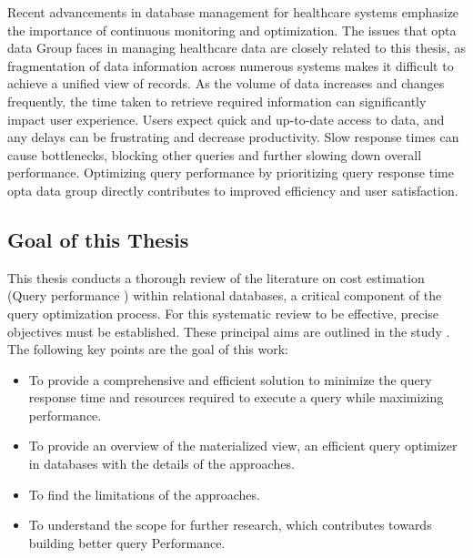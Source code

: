 
Recent advancements in database management for healthcare systems emphasize the importance of continuous monitoring and optimization. The issues that opta data Group faces in managing healthcare data are closely related to this thesis, as fragmentation of data information across numerous systems makes it difficult to achieve a unified view of records. As the volume of data increases and changes frequently, the time taken to retrieve required information can significantly impact user experience. Users expect quick and up-to-date access to data, and any delays can be frustrating and decrease productivity. Slow response times can cause bottlenecks, blocking other queries and further slowing down overall performance. Optimizing query performance by prioritizing query response time opta data group directly contributes to improved efficiency and user satisfaction.

\subsection{Goal of this Thesis}
\normalsize
This thesis conducts a thorough review of the literature on cost estimation (Query performance ) within relational databases, a critical component of the query optimization process. For this systematic review to be effective, precise objectives must be established. These principal aims are outlined in the study \cite{CostEstimation}. The following key points are the goal of this work: 
\begin{itemize}
   \item To provide a comprehensive and efficient solution to minimize the query response time and resources required to execute a query while maximizing performance.
   \item To provide an overview of the materialized view, an efficient query optimizer in databases with the details of the approaches.
  \item To find the limitations of the approaches.
  \item To understand the scope for further research, which contributes towards building
better query Performance. %
\end{itemize}


